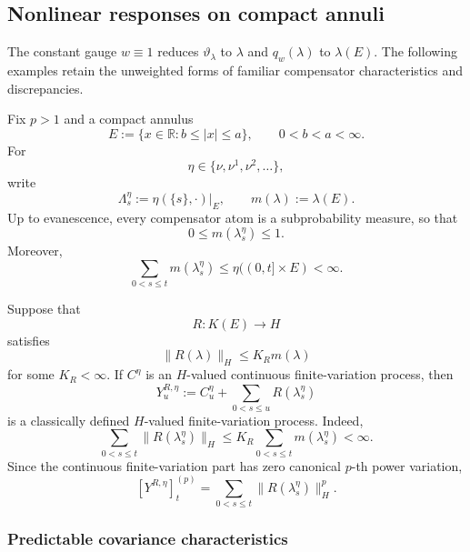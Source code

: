 \documentclass[a4paper,10pt]{article}
\begin{document}
\subsection{Nonlinear responses on compact annuli}
\label{subsec:annular-nonlinear-compensator-examples}

The constant gauge \(w\equiv1\) reduces
\(\vartheta_\lambda\) to \(\lambda\) and \(q_w(\lambda)\) to
\(\lambda(E)\). The following examples retain the unweighted forms
of familiar compensator characteristics and discrepancies.

Fix \(p>1\) and a compact annulus
\[
        E
        :=
        \{x\in\mathbb R:b\le |x|\le a\},
        \qquad
        0<b<a<\infty.
\]
For
\[
        \eta\in\{\nu,\nu^1,\nu^2,\ldots\},
\]
write
\[
        \Lambda_s^\eta
        :=
        \eta(\{s\},\cdot)|_E,
        \qquad
        m(\lambda)
        :=
        \lambda(E).
\]
Up to evanescence, every compensator atom is a subprobability measure,
so that
\[
        0\le m(\lambda_s^\eta)\le1.
\]
Moreover,
\[
\sum_{0<s\le t}m(\lambda_s^\eta)
\le
\eta((0,t]\times E)
<
\infty.
\]

Suppose that
\[
        R:K(E)\longrightarrow H
\]
satisfies
\[
        \lVert R(\lambda)\rVert_H
        \le
        K_Rm(\lambda)
\]
for some \(K_R<\infty\). If \(C^\eta\) is an \(H\)-valued continuous
finite-variation process,
then
\[
        Y_u^{R,\eta}
        :=
        C_u^\eta
        +
        \sum_{0<s\le u}R(\lambda_s^\eta)
\]
is a classically defined \(H\)-valued finite-variation process. Indeed,
\[
\sum_{0<s\le t}
\lVert R(\lambda_s^\eta)\rVert_H
\le
K_R\sum_{0<s\le t}m(\lambda_s^\eta)
<
\infty.
\]
Since the continuous finite-variation part has zero canonical
\(p\)-th power variation,
\[
        [Y^{R,\eta}]^{(p)}_t
        =
        \sum_{0<s\le t}
        \lVert R(\lambda_s^\eta)\rVert_H^p.
\]

\subsubsection{Predictable covariance characteristics}
\end{document}
